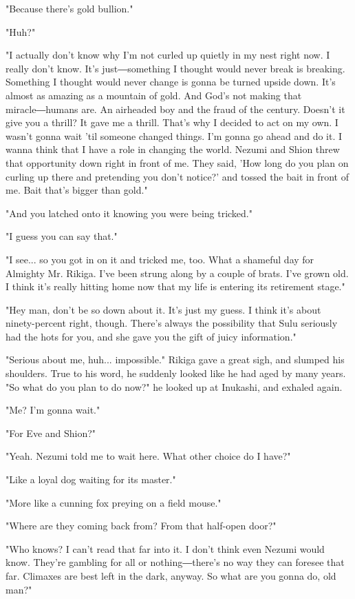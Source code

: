 "Because there's gold bullion."

"Huh?"

"I actually don't know why I'm not curled up quietly in my nest right
now. I really don't know. It's just―something I thought would never
break is breaking. Something I thought would never change is gonna be
turned upside down. It's almost as amazing as a mountain of gold. And
God's not making that miracle―humans are. An airheaded boy and the fraud
of the century. Doesn't it give you a thrill? It gave me a thrill.
That's why I decided to act on my own. I wasn't gonna wait 'til someone
changed things. I'm gonna go ahead and do it. I wanna think that I have
a role in changing the world. Nezumi and Shion threw that opportunity
down right in front of me. They said, 'How long do you plan on curling
up there and pretending you don't notice?' and tossed the bait in front
of me. Bait that's bigger than gold."

"And you latched onto it knowing you were being tricked."

"I guess you can say that."

"I see... so you got in on it and tricked me, too. What a shameful day
for Almighty Mr. Rikiga. I've been strung along by a couple of brats.
I've grown old. I think it's really hitting home now that my life is
entering its retirement stage."

"Hey man, don't be so down about it. It's just my guess. I think it's
about ninety-percent right, though. There's always the possibility that
Sulu seriously had the hots for you, and she gave you the gift of juicy
information."

"Serious about me, huh... impossible." Rikiga gave a great sigh, and
slumped his shoulders. True to his word, he suddenly looked like he had
aged by many years. "So what do you plan to do now?" he looked up at
Inukashi, and exhaled again.

"Me? I'm gonna wait."

"For Eve and Shion?"

"Yeah. Nezumi told me to wait here. What other choice do I have?"

"Like a loyal dog waiting for its master."

"More like a cunning fox preying on a field mouse."

"Where are they coming back from? From that half-open door?"

"Who knows? I can't read that far into it. I don't think even Nezumi
would know. They're gambling for all or nothing―there's no way they can
foresee that far. Climaxes are best left in the dark, anyway. So what
are you gonna do, old man?"

